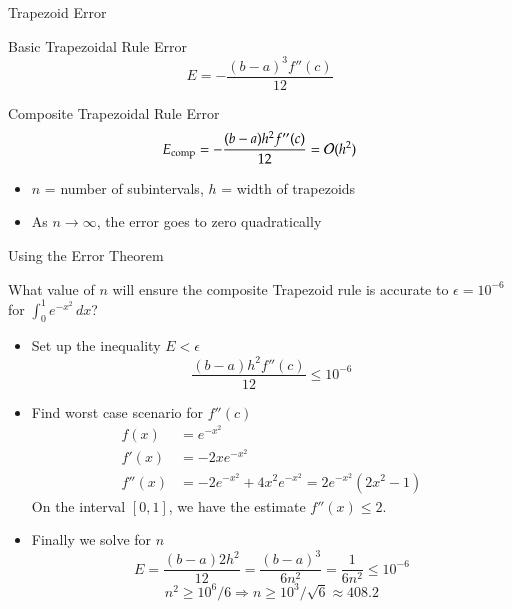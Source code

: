 \documentclass[10pt]{beamer}
\begin{document}
\begin{frame}{Trapezoid Error}
\begin{block}{Basic Trapezoidal Rule Error}
    $$E = -\frac{(b-a)^3 f''(c)}{12}$$
\end{block}
\begin{block}{Composite Trapezoidal Rule Error}
    $$E_{\textrm{comp}} = -\frac{(b-a) h^2 f''(c)}{12} = {\mathcal{O}}(h^2) $$
\end{block}
\begin{itemize}
    \item $n$ = number of subintervals, $h$ = width of trapezoids
    \item As $n\rightarrow\infty $, the error goes to zero quadratically
\end{itemize}

\end{frame}
\begin{frame}[shrink]{Using the Error Theorem}
\begin{example}
What value of $n$ will ensure the composite Trapezoid rule is accurate to $\epsilon = 10^{-6}$ for $\int_0^1 e^{-x^2}\,dx$?
\end{example}
\begin{itemize}
    \item Set up the inequality $E < \epsilon $ 
        \begin{equation*}
        \frac{(b-a) h^2 f''(c)}{12} \leq 10^{-6}
        \end{equation*}
    \item Find worst case scenario for $f''(c)$
        \begin{align*}
          f(x) &= e^{-x^2}\\
          f'(x) &=-2xe^{-x^2}\\
          f''(x) &=-2e^{-x^2}+4x^2e^{-x^2} = 2e^{-x^2}(2x^2-1)
        \end{align*}
        On the interval $[0,1]$, we have the estimate $f''(x)\le 2.$ 
    \item Finally we solve for $n$
        \begin{equation*}
        E = \frac{(b-a) 2 h^2}{12} = \frac{(b-a)^3}{6n^2} = \frac{1}{6n^2}  \leq 10^{-6}
        \end{equation*}
        \begin{equation*}
         n^{2} \ge  10^{6}/6   \Rightarrow  n \ge 10^{3}/\sqrt{6} \approx 408.2
        \end{equation*}

\end{itemize}
\end{frame}
\end{document}
